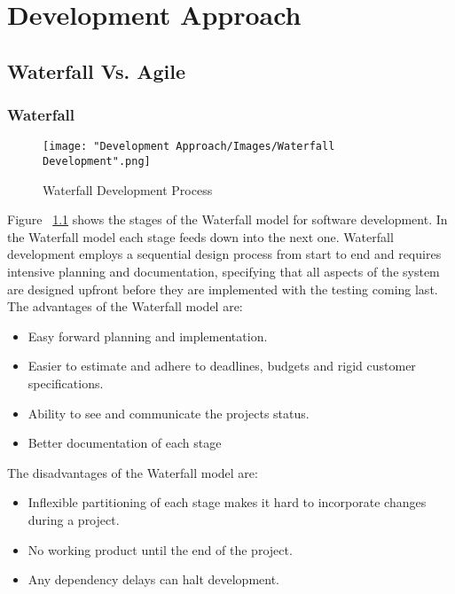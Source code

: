 \chapter{Development Approach}

	\section{Waterfall Vs. Agile}
	
	\subsection{Waterfall}
		\begin{figure}[H]
			\texttt{[image: "Development Approach/Images/Waterfall Development".png]}
			\centering
			\caption{Waterfall Development Process}
    			\label{fig:waterfallMethod}
		\end{figure}		
		
	Figure ~\ref{fig:waterfallMethod} shows the stages of the Waterfall model for software development. In the Waterfall model each stage feeds down into the next one. Waterfall development employs a sequential design process from start to end and requires intensive planning and documentation, specifying that all aspects of the system are designed upfront before they are implemented with the testing coming last.\\
	
	The advantages of the Waterfall model are:
	\begin{itemize}
		\item Easy forward planning and implementation.
		\item Easier to estimate and adhere to deadlines, budgets and rigid customer specifications.
		\item Ability to see and communicate the projects status.
		\item Better documentation of each stage
	\end{itemize}
	
	The disadvantages of the Waterfall model are:
	\begin{itemize}
		\item Inflexible partitioning of each stage makes it hard to incorporate changes during a project.
		\item No working product until the end of the project.
		\item Any dependency delays can halt development.
	\end{itemize}
	
